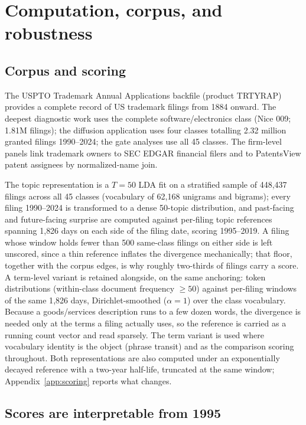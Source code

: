
\section{Computation, corpus, and robustness}\label{app:comp}

\subsection{Corpus and scoring}

The USPTO Trademark Annual Applications backfile (product TRTYRAP)
provides a complete record of US trademark filings from 1884 onward. The
deepest diagnostic work uses the complete software/electronics class
(Nice 009; 1.81M filings); the diffusion application uses four classes
totalling 2.32 million granted filings 1990--2024; the gate analyses use
all 45 classes. The firm-level panels link trademark owners to SEC EDGAR
financial filers and to PatentsView patent assignees by normalized-name
join.

The topic representation is a $T = 50$ LDA fit on a stratified sample of
448{,}437 filings across all 45 classes (vocabulary of 62{,}168 unigrams
and bigrams); every filing 1990--2024 is transformed to a dense 50-topic
distribution, and past-facing and future-facing surprise are computed against
per-filing topic references spanning 1{,}826 days on each side of the filing
date, scoring 1995--2019. A filing whose window holds fewer than 500
same-class filings on either side is left unscored, since a thin reference
inflates the divergence mechanically; that floor, together with the corpus
edges, is why roughly two-thirds of filings carry a score. A term-level variant is retained
alongside, on the same anchoring: token distributions (within-class
document frequency $\geq 50$) against per-filing windows of the same
1{,}826 days, Dirichlet-smoothed ($\alpha = 1$) over the class vocabulary.
Because a goods/services description runs to a few dozen words, the
divergence is needed only at the terms a filing actually uses, so the
reference is carried as a running count vector and read sparsely. The term
variant is used where vocabulary identity is the object (phrase transit)
and as the comparison scoring throughout. Both representations are also computed under an
exponentially decayed reference with a two-year half-life, truncated at the
same window; Appendix~\ref{app:scoring} reports what changes.

\subsection{Scores are interpretable from 1995}

